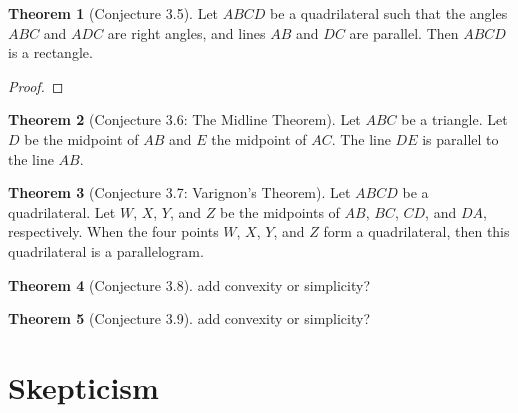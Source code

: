\documentclass{tufte-handout}
\theoremstyle{definition}
\newtheorem{theorem}{Theorem}[section]
\begin{document}
\begin{theorem}[Conjecture 3.5]
Let $ABCD$ be a quadrilateral such that the angles $ABC$ and $ADC$ are right angles, and lines $AB$ and $DC$ are parallel. Then $ABCD$ is a rectangle.
\end{theorem}

\begin{proof}

\end{proof}





\begin{theorem}[Conjecture 3.6: The Midline Theorem]
Let $ABC$ be a triangle. Let $D$ be the midpoint of $AB$ and $E$ the midpoint of $AC$. The line $DE$ is parallel to the line $AB$.
\end{theorem}

\begin{theorem}[Conjecture 3.7: Varignon's Theorem]
Let $ABCD$ be a quadrilateral. Let $W$, $X$, $Y$, and $Z$ be the midpoints of $AB$, $BC$, $CD$, and $DA$, respectively. When the four points $W$, $X$, $Y$, and $Z$ form a quadrilateral, then this quadrilateral is a parallelogram.
\end{theorem}

\begin{theorem}[Conjecture 3.8]
add convexity or simplicity?
\end{theorem}


\begin{theorem}[Conjecture 3.9]
add convexity or simplicity?
\end{theorem}


\clearpage
\setcounter{section}{4}
\setcounter{theorem}{0}
\section{Skepticism}\label{section:skepticism}
\end{document}
